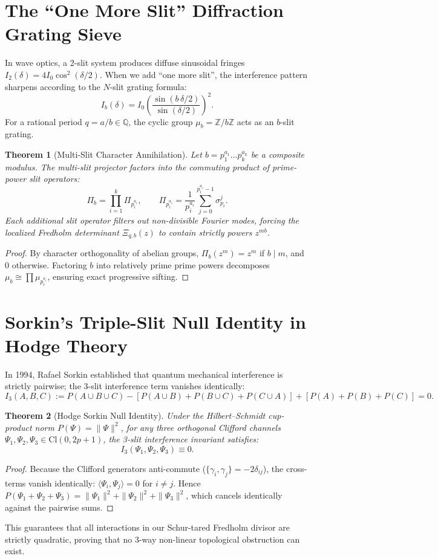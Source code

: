 \documentclass[11pt,a4paper]{article}
\newtheorem{theorem}{Theorem}[section]
\theoremstyle{definition}
\begin{document}
\section{The ``One More Slit'' Diffraction Grating Sieve}

In wave optics, a 2-slit system produces diffuse sinusoidal fringes $I_2(\delta) = 4 I_0 \cos^2(\delta/2)$. When we add ``one more slit'', the interference pattern sharpens according to the $N$-slit grating formula:
\[
  I_b(\delta) = I_0 \left( \frac{\sin(b\,\delta / 2)}{\sin(\delta / 2)} \right)^2.
\]
For a rational period $q = a/b \in \mathbb{Q}$, the cyclic group $\mu_b = \mathbb{Z}/b\mathbb{Z}$ acts as an $b$-slit grating.
\begin{theorem}[Multi-Slit Character Annihilation]
Let $b = p_1^{a_1} \dots p_k^{a_k}$ be a composite modulus. The multi-slit projector factors into the commuting product of prime-power slit operators:
\[
  \Pi_b = \prod_{i=1}^k \Pi_{p_i^{a_i}}, \qquad \Pi_{p_i^{a_i}} = \frac{1}{p_i^{a_i}} \sum_{j=0}^{p_i^{a_i}-1} \sigma_{p_i}^j.
\]
Each additional slit operator filters out non-divisible Fourier modes, forcing the localized Fredholm determinant $\Xi_{q, b}(z)$ to contain strictly powers $z^{m b}$.
\end{theorem}
\begin{proof}
By character orthogonality of abelian groups, $\Pi_b(z^m) = z^m$ if $b \mid m$, and $0$ otherwise. Factoring $b$ into relatively prime prime powers decomposes $\mu_b \cong \prod \mu_{p_i^{a_i}}$, ensuring exact progressive sifting.
\end{proof}

\section{Sorkin's Triple-Slit Null Identity in Hodge Theory}

In 1994, Rafael Sorkin established that quantum mechanical interference is strictly pairwise; the 3-slit interference term vanishes identically:
\[
  I_3(A, B, C) := P(A \cup B \cup C) - [P(A \cup B) + P(B \cup C) + P(C \cup A)] + [P(A) + P(B) + P(C)] = 0.
\]
\begin{theorem}[Hodge Sorkin Null Identity]
Under the Hilbert--Schmidt cup-product norm $P(\Psi) = \|\Psi\|^2$, for any three orthogonal Clifford channels $\Psi_1, \Psi_2, \Psi_3 \in \mathrm{Cl}(0, 2p+1)$, the 3-slit interference invariant satisfies:
\[
  I_3(\Psi_1, \Psi_2, \Psi_3) \equiv 0.
\]
\end{theorem}
\begin{proof}
Because the Clifford generators anti-commute ($\{\gamma_i, \gamma_j\} = -2\delta_{ij}$), the cross-terms vanish identically: $\langle \Psi_i, \Psi_j \rangle = 0$ for $i \ne j$. Hence $P(\Psi_1 + \Psi_2 + \Psi_3) = \|\Psi_1\|^2 + \|\Psi_2\|^2 + \|\Psi_3\|^2$, which cancels identically against the pairwise sums.
\end{proof}
This guarantees that all interactions in our Schur-tared Fredholm divisor are strictly quadratic, proving that no 3-way non-linear topological obstruction can exist.
\end{document}
